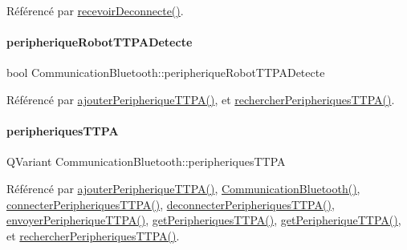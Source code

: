 Référencé par \hyperlink{class_communication_bluetooth_af187cbc294befb656070f9817763104b}{recevoir\+Deconnecte()}.

\mbox{\label{class_communication_bluetooth_ac4bf43e3da4748c8fa25e0ac1d3cf849}} 
\paragraph{\texorpdfstring{peripherique\+Robot\+T\+T\+P\+A\+Detecte}{peripheriqueRobotTTPADetecte}}
{\footnotesize\ttfamily bool Communication\+Bluetooth\+::peripherique\+Robot\+T\+T\+P\+A\+Detecte}



Référencé par \hyperlink{class_communication_bluetooth_a53bc4772892ec57f030600e49fa0b6ff}{ajouter\+Peripherique\+T\+T\+P\+A()}, et \hyperlink{class_communication_bluetooth_a4c2e2d557728c227faeb247cb8a9c482}{rechercher\+Peripheriques\+T\+T\+P\+A()}.

\mbox{\label{class_communication_bluetooth_a656a80f8216d2a4db7cf2f865365e562}} 
\paragraph{\texorpdfstring{peripheriques\+T\+T\+PA}{peripheriquesTTPA}}
{\footnotesize\ttfamily Q\+Variant Communication\+Bluetooth\+::peripheriques\+T\+T\+PA\hspace{0.3cm}{\ttfamily [read]}}



Référencé par \hyperlink{class_communication_bluetooth_a53bc4772892ec57f030600e49fa0b6ff}{ajouter\+Peripherique\+T\+T\+P\+A()}, \hyperlink{class_communication_bluetooth_ae1c3be7b0a32ee1142d958bad3d7c571}{Communication\+Bluetooth()}, \hyperlink{class_communication_bluetooth_a321073d9dc26aad4b34ecf41a1dee8a4}{connecter\+Peripheriques\+T\+T\+P\+A()}, \hyperlink{class_communication_bluetooth_aacfffa47d72f3ab5ab554001d5f38fd1}{deconnecter\+Peripheriques\+T\+T\+P\+A()}, \hyperlink{class_communication_bluetooth_a73d95b841bf64a4463760435a41fc219}{envoyer\+Peripherique\+T\+T\+P\+A()}, \hyperlink{class_communication_bluetooth_a08f0efb9f8a5a9f0660aad870032b9d3}{get\+Peripheriques\+T\+T\+P\+A()}, \hyperlink{class_communication_bluetooth_a1baec10cc16afe1a87cbad635a82c323}{get\+Peripherique\+T\+T\+P\+A()}, et \hyperlink{class_communication_bluetooth_a4c2e2d557728c227faeb247cb8a9c482}{rechercher\+Peripheriques\+T\+T\+P\+A()}.

